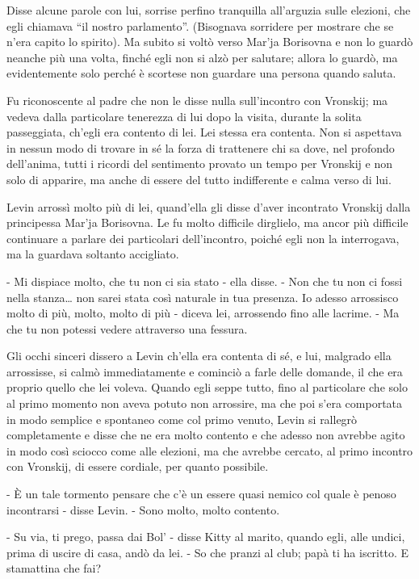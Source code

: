 Disse alcune parole con lui, sorrise perfino tranquilla all'arguzia sulle elezioni, che egli chiamava ``il nostro parlamento''. (Bisognava sorridere per mostrare che se n'era capito lo spirito). Ma subito si voltò verso Mar'ja Borisovna e non lo guardò neanche più una volta, finché egli non si alzò per salutare; allora lo guardò, ma evidentemente solo perché è scortese non guardare una persona quando saluta. 

Fu riconoscente al padre che non le disse nulla sull'incontro con Vronskij; ma vedeva dalla particolare tenerezza di lui dopo la visita, durante la solita passeggiata, ch'egli era contento di lei. Lei stessa era contenta. Non si aspettava in nessun modo di trovare in sé la forza di trattenere chi sa dove, nel profondo dell'anima, tutti i ricordi del sentimento provato un tempo per Vronskij e non solo di apparire, ma anche di essere del tutto indifferente e calma verso di lui. 

Levin arrossì molto più di lei, quand'ella gli disse d'aver incontrato Vronskij dalla principessa Mar'ja Borisovna. Le fu molto difficile dirglielo, ma ancor più difficile continuare a parlare dei particolari dell'incontro, poiché egli non la interrogava, ma la guardava soltanto accigliato. 

- Mi dispiace molto, che tu non ci sia stato - ella disse. - Non che tu non ci fossi nella stanza\ldots{} non sarei stata così naturale in tua presenza. Io adesso arrossisco molto di più, molto, molto di più - diceva lei, arrossendo fino alle lacrime. - Ma che tu non potessi vedere attraverso una fessura. 

Gli occhi sinceri dissero a Levin ch'ella era contenta di sé, e lui, malgrado ella arrossisse, si calmò immediatamente e cominciò a farle delle domande, il che era proprio quello che lei voleva. Quando egli seppe tutto, fino al particolare che solo al primo momento non aveva potuto non arrossire, ma che poi s'era comportata in modo semplice e spontaneo come col primo venuto, Levin si rallegrò completamente e disse che ne era molto contento e che adesso non avrebbe agito in modo così sciocco come alle elezioni, ma che avrebbe cercato, al primo incontro con Vronskij, di essere cordiale, per quanto possibile. 

- È un tale tormento pensare che c'è un essere quasi nemico col quale è penoso incontrarsi - disse Levin. - Sono molto, molto contento. 

\label{ii-6} 

- Su via, ti prego, passa dai Bol' - disse Kitty al marito, quando egli, alle undici, prima di uscire di casa, andò da lei. - So che pranzi al club; papà ti ha iscritto. E stamattina che fai? 

